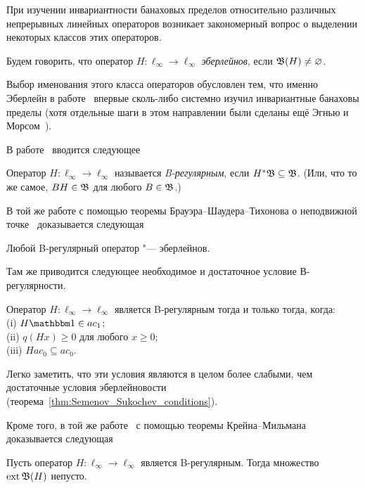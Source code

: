 При изучении инвариантности банаховых пределов относительно различных непрерывных линейных операторов
возникает закономерный вопрос о выделении некоторых классов этих операторов.

\begin{definition}
	Будем говорить, что оператор $H : \ell_\infty \to \ell_\infty$ \emph{эберлейнов},
	если $\mathfrak{B} (H) \ne \varnothing$.
\end{definition}

Выбор именования этого класса операторов обусловлен тем, что именно Эберлейн в работе~\cite{Eberlein}
впервые сколь-либо системно изучил инвариантные банаховы пределы
(хотя отдельные шаги в этом направлении были сделаны ещё Эгнью и Морсом~\cite{agnew1938linear,agnew1938extensions}).

В работе~\cite{alekhno2018invariant} вводится следующее

\begin{definition}
	\label{def:B-regular_operator}
	Оператор $H : \ell_\infty \to \ell_\infty$ называется \emph{B-регулярным},
	если $H^*\mathfrak{B} \subseteq \mathfrak{B}$.
	(Или, что то же самое, $BH\in\mathfrak{B}$ для любого $B\in\mathfrak{B}$.)
\end{definition}

В той же работе с помощью теоремы Брауэра--Шаудера--Тихонова о неподвижной точке~\cite[Corollary  17.56]{aliprantis2006infinite}
доказывается следующая
\begin{theorem}
	\label{thm:B-regular_is_Eberlein}
	Любой B-регулярный оператор "--- эберлейнов.
\end{theorem}
Там же приводится следующее необходимое и достаточное условие В-регулярности.

\begin{theorem}
	\label{thm:crit_B_regularity}
	Оператор $H:\ell_\infty \to \ell_\infty$ является B-регулярным тогда и только тогда, когда:
	\\(i) $H\one \in ac_1$;
	\\(ii) $q(Hx)\geq 0$ для любого $x\geq 0$;
	\\(iii) $H ac_0 \subseteq ac_0$.
\end{theorem}
Легко заметить, что эти условия являются в целом более слабыми, чем достаточные условия эберлейновости
(теорема~\ref{thm:Semenov_Sukochev_conditions}).

Кроме того, в той же работе~\cite{alekhno2018invariant}
с помощью теоремы Крейна--Мильмана~\cite[теорема  9.14]{aliprantis2006positive}
доказывается следующая
\begin{lemma}
	Пусть оператор $H:\ell_\infty\to\ell_\infty$ является B-регулярным.
	Тогда множество $\operatorname{ext}\mathfrak{B}(H)$ непусто.
\end{lemma}

